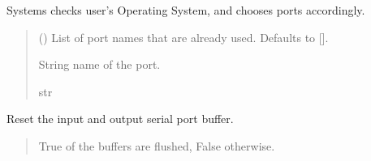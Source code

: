 \documentclass[letterpaper,10pt,english]{sphinxmanual}
\begin{document}
\begin{fulllineitems}
\begin{fulllineitems}
\end{fulllineitems}


\begin{fulllineitems}
\label{\detokenize{Morelia.Devices:Morelia.Devices.BasicPodProtocol.Pod.ChoosePort}}
\pysigstartsignatures
{}
\pysigstopsignatures
\sphinxAtStartPar
Systems checks user’s Operating System, and chooses ports accordingly.
\begin{quote}\begin{description}
\sphinxAtStartPar
{} (\sphinxstyleliteralemphasis{\sphinxupquote{{[}}}\sphinxstyleliteralemphasis{\sphinxupquote{{]}}}\sphinxstyleliteralemphasis{\sphinxupquote{, }}) \textendash{} List of port names that are already used. Defaults to {[}{]}.

\sphinxAtStartPar
String name of the port.

\sphinxAtStartPar
str

\end{description}\end{quote}

\end{fulllineitems}


\begin{fulllineitems}
\label{\detokenize{Morelia.Devices:Morelia.Devices.BasicPodProtocol.Pod.FlushPort}}
\pysigstartsignatures
{}
\pysigstopsignatures
\sphinxAtStartPar
Reset the input and output serial port buffer.
\begin{quote}\begin{description}
\sphinxAtStartPar
True of the buffers are flushed, False otherwise.


\end{description}
\end{quote}
\end{fulllineitems}
\end{fulllineitems}
\end{document}
